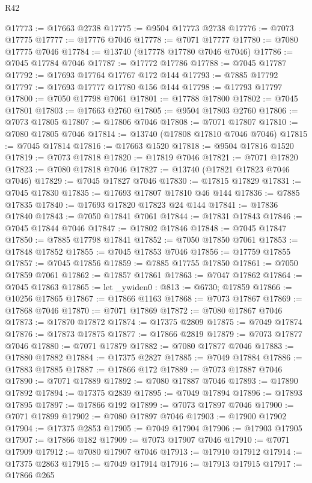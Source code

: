 \begin{lexlean}{R42}
\begin{coremodule}
{@17773 := @17663 @2738
@17775 := @9504 @17773 @2738
@17776 := @7073 @17775
@17777 := @17776 @7046
@17778 := @7071 @17777
@17780 := @7080 @17775 @7046
@17784 := @13740 (@17778 @17780 @7046 @7046)
@17786 := @7045 @17784 @7046
@17787 := @17772 @17786
@17788 := @7045 @17787
@17792 := @17693 @17764 @17767 @172 @144
@17793 := @7885 @17792
@17797 := @17693 @17777 @17780 @156 @144
@17798 := @17793 @17797
@17800 := @7050 @17798 @7061
@17801 := @17788 @17800
@17802 := @7045 @17801
@17803 := @17663 @2760
@17805 := @9504 @17803 @2760
@17806 := @7073 @17805
@17807 := @17806 @7046
@17808 := @7071 @17807
@17810 := @7080 @17805 @7046
@17814 := @13740 (@17808 @17810 @7046 @7046)
@17815 := @7045 @17814
@17816 := @17663 @1520
@17818 := @9504 @17816 @1520
@17819 := @7073 @17818
@17820 := @17819 @7046
@17821 := @7071 @17820
@17823 := @7080 @17818 @7046
@17827 := @13740 (@17821 @17823 @7046 @7046)
@17829 := @7045 @17827 @7046
@17830 := @17815 @17829
@17831 := @7045 @17830
@17835 := @17693 @17807 @17810 @46 @144
@17836 := @7885 @17835
@17840 := @17693 @17820 @17823 @24 @144
@17841 := @17836 @17840
@17843 := @7050 @17841 @7061
@17844 := @17831 @17843
@17846 := @7045 @17844 @7046
@17847 := @17802 @17846
@17848 := @7045 @17847
@17850 := @7885 @17798 @17841
@17852 := @7050 @17850 @7061
@17853 := @17848 @17852
@17855 := @7045 @17853 @7046
@17856 := @17759 @17855
@17857 := @7045 @17856
@17859 := @7885 @17755 @17850
@17861 := @7050 @17859 @7061
@17862 := @17857 @17861
@17863 := @7047 @17862
@17864 := @7045 @17863
@17865 := let _ywiden0 : @813 := @6730; @17859
@17866 := @10256 @17865
@17867 := @17866 @1163
@17868 := @7073 @17867
@17869 := @17868 @7046
@17870 := @7071 @17869
@17872 := @7080 @17867 @7046
@17873 := @17870 @17872
@17874 := @17375 @2809
@17875 := @7049 @17874
@17876 := @17873 @17875
@17877 := @17866 @2819
@17879 := @7073 @17877 @7046
@17880 := @7071 @17879
@17882 := @7080 @17877 @7046
@17883 := @17880 @17882
@17884 := @17375 @2827
@17885 := @7049 @17884
@17886 := @17883 @17885
@17887 := @17866 @172
@17889 := @7073 @17887 @7046
@17890 := @7071 @17889
@17892 := @7080 @17887 @7046
@17893 := @17890 @17892
@17894 := @17375 @2839
@17895 := @7049 @17894
@17896 := @17893 @17895
@17897 := @17866 @192
@17899 := @7073 @17897 @7046
@17900 := @7071 @17899
@17902 := @7080 @17897 @7046
@17903 := @17900 @17902
@17904 := @17375 @2853
@17905 := @7049 @17904
@17906 := @17903 @17905
@17907 := @17866 @182
@17909 := @7073 @17907 @7046
@17910 := @7071 @17909
@17912 := @7080 @17907 @7046
@17913 := @17910 @17912
@17914 := @17375 @2863
@17915 := @7049 @17914
@17916 := @17913 @17915
@17917 := @17866 @265
}
\end{coremodule}
\end{lexlean}
